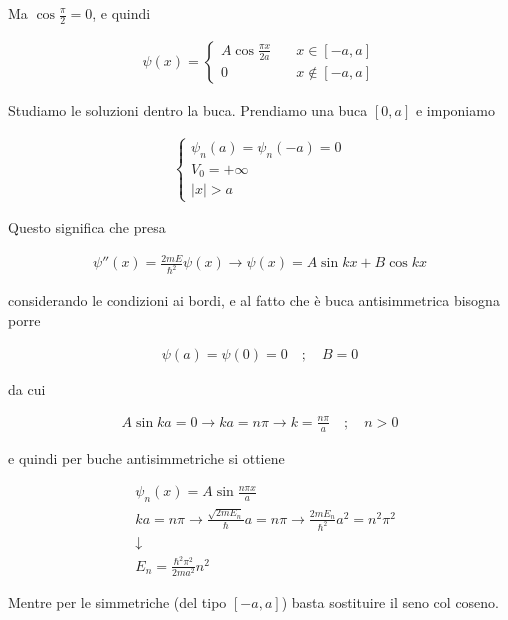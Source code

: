 Ma $\cos{\frac{\pi}{2}}=0$, e quindi

\begin{align}
\psi(x)=
\left\{
\begin{array}{ccc}
A\cos{\frac{\pi x}{2a}} \quad {}& x\in [-a,a] \\
0 &x\notin [-a,a]
\end{array} 
\right.
\end{align}

Studiamo le soluzioni dentro la buca. Prendiamo una buca $[0,a]$ e imponiamo

\begin{align}
\left\{
\begin{array}{ccc}
\psi_n(a)= \psi_n(-a)=0\\
V_0=+\infty \qquad \qquad \;\,\\
|x|>a \quad \qquad \qquad \;\;
\end{array} 
\right.
\end{align}

Questo significa che presa

\begin{align}
\psi''(x)= \frac{2mE}{\hbar^2}\psi(x) \rightarrow \psi(x)= A\sin{kx}+B\cos{kx}
\end{align}

considerando le condizioni ai bordi, e al fatto che è buca antisimmetrica bisogna porre

\begin{align}
\psi(a)=\psi(0)=0 \quad ; \quad B=0
\end{align}

da cui

\begin{align}
A\sin{ka}=0 \rightarrow ka=n\pi \rightarrow k = \frac{n\pi}{a} \quad ; \quad n>0
\end{align}

e quindi per buche antisimmetriche si ottiene

\begin{align}
{}&\psi_n(x)= A\sin{\frac{n\pi x}{a}} \\
&ka=n\pi \rightarrow \frac{\sqrt{2mE_n}}{\hbar}a= n\pi \rightarrow \frac{2mE_n}{\hbar^2}a^2= n^2\pi^2 \nonumber \\
&\downarrow \nonumber\\
&E_n= \frac{\hbar^2 \pi^2}{2ma^2}n^2
\end{align}

Mentre per le simmetriche (del tipo $ [-a,a]$) basta sostituire il seno col coseno.

